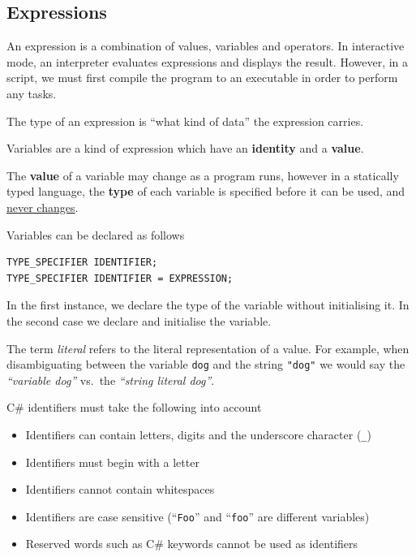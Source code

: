 \documentclass{article}
\begin{document}
\subsection{Expressions}
\begin{definition}[Expressions]
    An expression is a combination of values, variables and operators.
    In interactive mode, an interpreter evaluates expressions and displays the result.
    However, in a script, we must first compile the program to an executable in order
    to perform any tasks.
\end{definition}
\begin{definition}[Type]
    The type of an expression is ``what kind of data'' the expression carries.
\end{definition}
\begin{definition}[Variables]
    Variables are a kind of expression which have an \textbf{identity} and a \textbf{value}.

    The \textbf{value} of a variable may change as a program runs, however in
    a statically typed language, the \textbf{type} of each variable is
    specified before it can be used, and \underline{never changes}.

    Variables can be declared as follows
    \begin{lstlisting}
TYPE_SPECIFIER IDENTIFIER;
TYPE_SPECIFIER IDENTIFIER = EXPRESSION;
    \end{lstlisting}
    In the first instance, we declare the type of the variable without initialising it.
    In the second case we declare and initialise the variable.
\end{definition}
\begin{definition}[Literal]
    The term \textit{literal} refers to the literal representation of a value.
    For example, when disambiguating between the variable \lstinline!dog!
    and the string \lstinline!"dog"! we would say the \emph{``variable dog''} %
    vs.\ the \emph{``string literal dog''}.
\end{definition}
C\# identifiers must take the following into account
\begin{itemize}
    \item Identifiers can contain letters, digits and the underscore character (\lstinline!_!)
    \item Identifiers must begin with a letter
    \item Identifiers cannot contain whitespaces
    \item Identifiers are case sensitive (``\lstinline!Foo!'' and ``\lstinline!foo!'' are different variables)
    \item Reserved words such as C\# keywords cannot be used as identifiers
\end{itemize}
\end{document}
